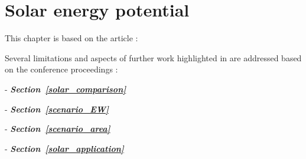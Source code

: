 \chapter{Solar energy potential}
\label{solar}

\vspace{-45pt} %
\begin{tcolorbox}[enhanced,width=\textwidth,size=fbox,
        sharp corners,colframe=black!5!white,drop fuzzy shadow southeast,
        boxrule=3mm, parbox=false] %
This chapter is based on the article \citep{walch_big_2020}:

\qquad {}

Several limitations and aspects of further work highlighted in \cite{walch_big_2020} are addressed based on the conference proceedings \cite{walch_critical_2019, walch_quantification_2021, castello_quantification_2021, walch_fast_2019}: 


\quad {} - \textit{\textbf{Section~\ref{solar_comparison}}} 

\quad {} - \textit{\textbf{Section~\ref{scenario_EW}}} 

\quad {} - \textit{\textbf{Section~\ref{scenario_area}}} 

\quad {} - \textit{\textbf{Section~\ref{solar_application}}} 
\end{tcolorbox}

